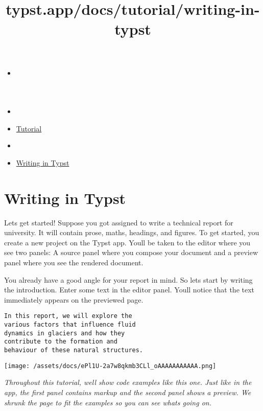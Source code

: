 \title{typst.app/docs/tutorial/writing-in-typst}

\begin{itemize}
\tightlist
\item
  \href{/docs}{}
\item
  
\item
  \href{/docs/tutorial/}{Tutorial}
\item
  
\item
  \href{/docs/tutorial/writing-in-typst/}{Writing in Typst}
\end{itemize}

\section{Writing in Typst}\label{writing-in-typst}

Let\textquotesingle s get started! Suppose you got assigned to write a
technical report for university. It will contain prose, maths, headings,
and figures. To get started, you create a new project on the Typst app.
You\textquotesingle ll be taken to the editor where you see two panels:
A source panel where you compose your document and a preview panel where
you see the rendered document.


You already have a good angle for your report in mind. So
let\textquotesingle s start by writing the introduction. Enter some text
in the editor panel. You\textquotesingle ll notice that the text
immediately appears on the previewed page.

\begin{verbatim}
In this report, we will explore the
various factors that influence fluid
dynamics in glaciers and how they
contribute to the formation and
behaviour of these natural structures.
\end{verbatim}

\texttt{[image: /assets/docs/ePl1U-2a7w8qkmb3CLl\_oAAAAAAAAAAA.png]}

\emph{Throughout this tutorial, we\textquotesingle ll show code examples
like this one. Just like in the app, the first panel contains markup and
the second panel shows a preview. We shrunk the page to fit the examples
so you can see what\textquotesingle s going on.}

